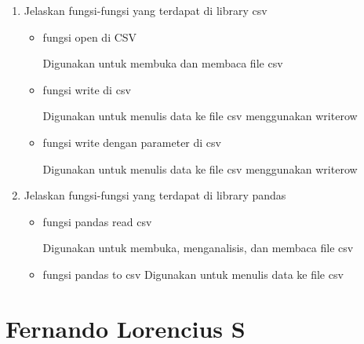 \begin{enumerate}
\item Jelaskan fungsi-fungsi yang terdapat di library csv
\begin{itemize}

	\item fungsi open di CSV
	
	Digunakan untuk membuka dan membaca file csv
	

	\item fungsi write di csv
	
	Digunakan untuk menulis data ke file csv menggunakan writerow
	
	
	\item fungsi write dengan parameter di csv
	
	Digunakan untuk menulis data ke file csv menggunakan writerow
	

\end{itemize}

\item Jelaskan fungsi-fungsi yang terdapat di library pandas
\begin{itemize}

	\item fungsi pandas read csv
	
	Digunakan untuk membuka, menganalisis, dan membaca file csv
	
	
	\item fungsi pandas to csv
	Digunakan untuk menulis data ke file csv
	

\end{itemize}
\end{enumerate}



\section{Fernando Lorencius S}
